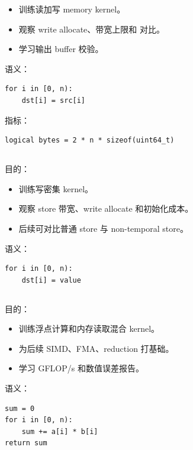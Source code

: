 \begin{itemize}
  \item 训练读加写 memory kernel。
  \item 观察 write allocate、带宽上限和  对比。
  \item 学习输出 buffer 校验。
\end{itemize}

语义：

\begin{lstlisting}
for i in [0, n):
    dst[i] = src[i]
\end{lstlisting}

指标：

\begin{lstlisting}
logical bytes = 2 * n * sizeof(uint64_t)
\end{lstlisting}

\subsection{}

目的：

\begin{itemize}
  \item 训练写密集 kernel。
  \item 观察 store 带宽、write allocate 和初始化成本。
  \item 后续可对比普通 store 与 non-temporal store。
\end{itemize}

语义：

\begin{lstlisting}
for i in [0, n):
    dst[i] = value
\end{lstlisting}

\subsection{}

目的：

\begin{itemize}
  \item 训练浮点计算和内存读取混合 kernel。
  \item 为后续 SIMD、FMA、reduction 打基础。
  \item 学习 GFLOP/s 和数值误差报告。
\end{itemize}

语义：

\begin{lstlisting}
sum = 0
for i in [0, n):
    sum += a[i] * b[i]
return sum
\end{lstlisting}

